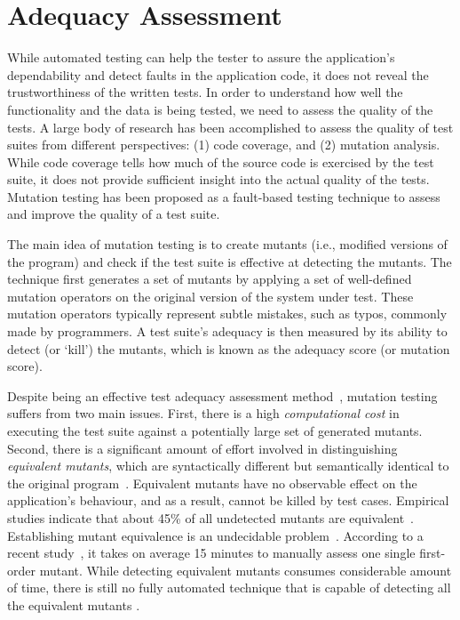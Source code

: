\section{Adequacy Assessment} \label{Sec:adequacy}
While automated testing can help the tester to assure the application's dependability and detect faults in the application code, it does not reveal the trustworthiness of the written tests.
In order to understand how well the functionality and the data is being tested, we need to assess the quality of the tests.
A large body of research has been accomplished to assess the quality of test suites
from different perspectives: (1) code coverage, and (2) mutation analysis.
While code coverage tells how much of the source code is exercised by the test suite, it does not provide sufficient insight into the actual quality of the tests. Mutation testing has been proposed as a fault-based testing technique to assess and improve the quality of a test suite.

The main idea of mutation testing is to create mutants (i.e., modified versions of the program) and check if the test suite is effective at detecting the mutants. 
The technique first generates a set of mutants by applying a set of well-defined mutation operators on the original version of the system under test. 
These mutation operators typically represent subtle mistakes, such as typos, commonly made by programmers. A test suite's adequacy is then measured by its ability to detect (or `kill') the mutants, which is known as the adequacy score (or mutation score).

Despite being an effective test adequacy assessment method~\cite{andrews:icse05,jia:tse10}, mutation testing suffers from two main issues.  First, there is a high \emph{computational cost} in executing the test suite against a potentially large set of generated mutants. Second, there is a significant amount of effort  involved in distinguishing \emph{equivalent mutants}, which are syntactically different but semantically identical to the original program~\cite{budd:acta82}.  Equivalent mutants have no observable effect on the application's behaviour, and as a result, cannot be killed by test cases. Empirical studies indicate that about 45\% of all undetected mutants are equivalent~\cite{schuler:tvr12, madeyski:tse13}.   
Establishing mutant equivalence is an undecidable problem~\cite{budd:acta82}. 
According to a recent study~\cite{madeyski:tse13}, it takes on average 15 minutes to manually assess one single first-order mutant. While detecting equivalent mutants consumes considerable amount of time, there is still no fully automated technique that is capable of detecting all the equivalent mutants \cite{madeyski:tse13}.


